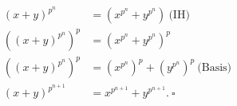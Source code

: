 \documentclass{article}
\begin{document}
\begin{equation*}
\begin{aligned}
(x+y)^{p^{n}} &= (x^{p^n}+y^{p^n})~\text{(IH)} \\
((x+y)^{p^{n}})^p &= (x^{p^n}+y^{p^n})^p \\
((x+y)^{p^{n}})^p &= (x^{p^n})^p+(y^{p^n})^p~\text{(Basis)}\\
(x+y)^{p^{n+1}} &= x^{p^{n+1}}+y^{p^{n+1}}.~\square\\
\end{aligned}
\end{equation*}
\end{document}
